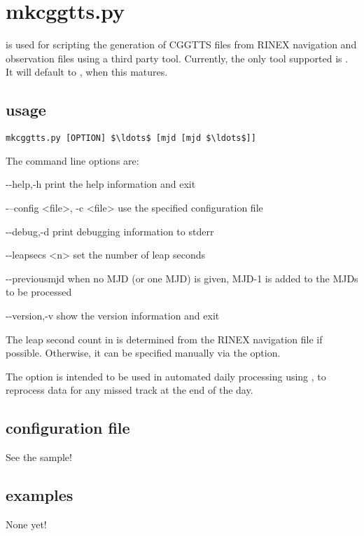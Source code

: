 \section{mkcggtts.py \label{s:mkcggtts}}

\hypertarget{h:mkcggtts}{}

 is used for scripting the generation of CGGTTS files from RINEX navigation and observation files using
a third party tool. Currently, the only tool supported is . It will default to , when this matures.

\subsection{usage}

\begin{lstlisting}[mathescape=true]
mkcggtts.py [OPTION] $\ldots$ [mjd [mjd $\ldots$]]
\end{lstlisting}
The command line options are:
\begin{description*}
	
	\item[-{}-help,-h]	print the help information and exit
	\item[-{}--config \textless{file}\textgreater, -c \textless{file}\textgreater] use the specified configuration file 
	\item[-{}-debug,-d]	print debugging information to stderr
	\item[-{}-leapsecs \textless{n}\textgreater]	set the number of leap seconds
	\item[-{}-previousmjd]	when no MJD (or one MJD) is given, MJD-1 is added to the MJDs to be processed
	\item[-{}-version,-v] show the version information and exit
\end{description*}

The leap second count in  is determined from the RINEX navigation file if possible.
Otherwise, it can be specified manually via  the  option.

The  option is intended to be used in automated daily processing using , 
to reprocess data for any missed track at the end of the day.

\subsection{configuration file}

See the sample!

\subsection{examples}

None yet!
